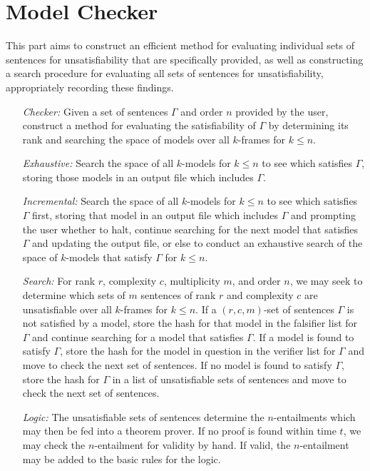 \documentclass[a4paper, 11pt]{article} %
\begin{document}




\section{Model Checker}

This part aims to construct an efficient method for evaluating individual sets of sentences for unsatisfiability that are specifically provided, as well as constructing a search procedure for evaluating all sets of sentences for unsatisfiability, appropriately recording these findings.

\begin{enumerate}
  \item[\it Checker:] Given a set of sentences $\Gamma$ and order $n$ provided by the user, construct a method for evaluating the satisfiability of $\Gamma$ by determining its rank and searching the space of models over all $k$-frames for $k\leq n$.
  \item[\it Exhaustive:] Search the space of all $k$-models for $k\leq n$ to see which satisfies $\Gamma$, storing those models in an output file which includes $\Gamma$. 
  \item[\it Incremental:] Search the space of all $k$-models for $k\leq n$ to see which satisfies $\Gamma$ first, storing that model in an output file which includes $\Gamma$ and prompting the user whether to halt, continue searching for the next model that satisfies $\Gamma$ and updating the output file, or else to conduct an exhaustive search of the space of $k$-models that satisfy $\Gamma$ for $k\leq n$.
  \item[\it Search:] For rank $r$, complexity $c$, multiplicity $m$, and order $n$, we may seek to determine which sets of $m$ sentences of rank $r$ and complexity $c$ are unsatisfiable over all $k$-frames for $k\leq n$. If a $(r,c,m)$-set of sentences $\Gamma$ is not satisfied by a model, store the hash for that model in the falsifier list for $\Gamma$ and continue searching for a model that satisfies $\Gamma$. If a model is found to satisfy $\Gamma$, store the hash for the model in question in the verifier list for $\Gamma$ and move to check the next set of sentences. If no model is found to satisfy $\Gamma$, store the hash for $\Gamma$ in a list of unsatisfiable sets of sentences and move to check the next set of sentences. 
  \item[\it Logic:] The unsatisfiable sets of sentences determine the $n$-entailments which may then be fed into a theorem prover. If no proof is found within time $t$, we may check the $n$-entailment for validity by hand. If valid, the $n$-entailment may be added to the basic rules for the logic.
\end{enumerate}
\end{document}
